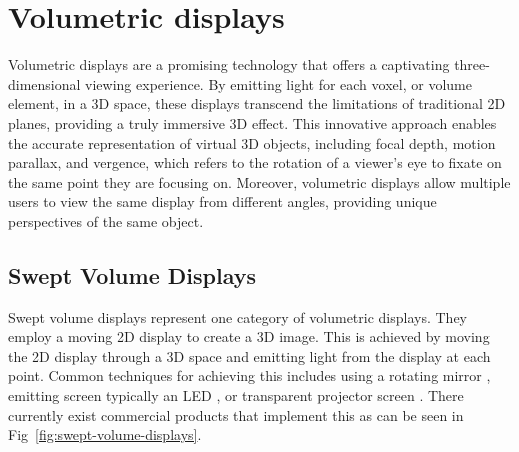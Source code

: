 \section{Volumetric displays}

Volumetric displays \cite{1492264} are a promising technology that offers a captivating three-dimensional viewing experience. By emitting light for each voxel, or volume element, in a 3D space, these displays transcend the limitations of traditional 2D planes, providing a truly immersive 3D effect. This innovative approach enables the accurate representation of virtual 3D objects, including focal depth, motion parallax, and vergence, which refers to the rotation of a viewer's eye to fixate on the same point they are focusing on. Moreover, volumetric displays allow multiple users to view the same display from different angles, providing unique perspectives of the same object.

\subsection{Swept Volume Displays}
Swept volume displays represent one category of volumetric displays. They employ a moving 2D display to create a 3D image. This is achieved by moving the 2D display through a 3D space and emitting light from the display at each point. Common techniques for achieving this includes using a rotating mirror \cite{10.1117/12.480930}, emitting screen typically an LED \cite{Gately:11}, or transparent projector screen \cite{keane_volumetric_2016}. There currently exist commercial products that implement this as can be seen in Fig~\ref{fig:swept-volume-displays}.


